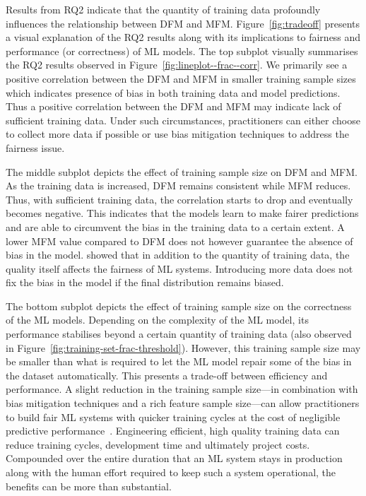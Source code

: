 \documentclass[sigconf,review,anonymous]{acmart}
\begin{document}
Results from RQ2 indicate that the quantity of training data
profoundly influences the relationship between DFM and MFM.
Figure \ref{fig:tradeoff} presents a visual explanation of the RQ2
results along with its implications to fairness and performance (or
correctness) of ML models. The top subplot visually summarises the RQ2
results observed in Figure \ref{fig:lineplot--frac--corr}. We
primarily see a positive correlation between the DFM and MFM in
smaller training sample sizes which indicates presence of bias in both
training data and model predictions. Thus a positive correlation
between the DFM and MFM may indicate lack of sufficient training data.
Under such circumstances, practitioners can either choose to collect
more data if possible or use bias mitigation techniques to address the
fairness issue.

The middle subplot depicts the effect of training sample size on DFM
and MFM. As the training data is increased, DFM remains consistent
while MFM reduces. Thus, with sufficient training data, the
correlation starts to drop and eventually becomes negative. This
indicates that the models learn to make fairer predictions and are
able to circumvent the bias in the training data to a certain extent.
A lower MFM value compared to DFM does not however guarantee the
absence of bias in the model. \citeauthor{zhang2021ignorance} showed
that in addition to the quantity of training data, the quality itself
affects the fairness of ML systems. Introducing more data does not fix
the bias in the model if the final distribution remains biased.

The bottom subplot depicts the effect of training sample size on the
correctness of the ML models. Depending on the complexity of the ML
model, its performance stabilises beyond a certain quantity of
training data (also observed in
Figure \ref{fig:training-set-frac-threshold}). However, this training
sample size may be smaller than what is required to let the ML model
repair some of the bias in the dataset automatically. This presents a
trade-off between efficiency and performance. A slight reduction in
the training sample size---in combination with bias mitigation
techniques and a rich feature sample size---can allow practitioners to
build fair ML systems with quicker training cycles at the cost of
negligible predictive
performance \cite{verdecchia2022data,zhang2021ignorance}. Engineering
efficient, high quality training data can reduce training cycles,
development time and ultimately project costs. Compounded over the
entire duration that an ML system stays in production along with the
human effort required to keep such a system operational, the benefits
can be more than substantial.
\end{document}
